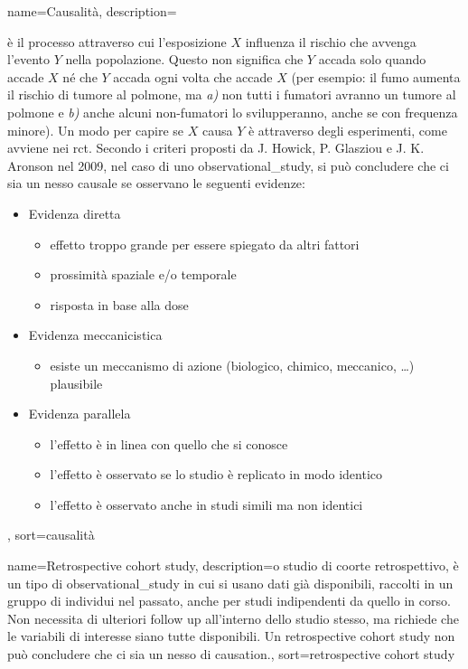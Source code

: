 {
	 name={Causalit\`a},
	 description={\`e il processo attraverso cui l'esposizione $X$ influenza il rischio che avvenga l'evento $Y$ nella popolazione. Questo non significa che $Y$ accada solo quando accade $X$ n\'e che $Y$ accada ogni volta che accade $X$ (per esempio: il fumo aumenta il rischio di tumore al polmone, ma \emph{a)} non tutti i fumatori avranno un tumore al polmone e \emph{b)} anche alcuni non-fumatori lo svilupperanno, anche se con frequenza minore). Un modo per capire se $X$ causa $Y$ \`e attraverso degli esperimenti, come avviene nei \gls{rct}. Secondo i criteri proposti da J. Howick, P. Glasziou e J. K. Aronson nel 2009, nel caso di uno \gls{observational_study}, si pu\`o concludere che ci sia un nesso causale se osservano le seguenti evidenze: 
	 \begin{itemize}
		 \item Evidenza diretta
		 	\begin{itemize} 
				\item effetto troppo grande per essere spiegato da altri fattori
        		\item prossimit\`a spaziale e/o temporale
        		\item risposta in base alla dose
			\end{itemize}
		\item Evidenza meccanicistica
	 		\begin{itemize} 
				\item esiste un meccanismo di azione (biologico, chimico, meccanico, \dots) plausibile
			\end{itemize}
		\item	Evidenza parallela
	 		\begin{itemize} 
				\item l'effetto \`e in linea con quello che si conosce
       		 	\item l'effetto \`e osservato se lo studio \`e replicato in modo identico
       		 	\item l'effetto \`e osservato anche in studi simili ma non identici
			\end{itemize}
	\end{itemize}
	},
	 sort={causalit\`a}
}

{
	name={Retrospective cohort study},
	description={o studio di coorte retrospettivo, \`e un tipo di \gls{observational_study} in cui si usano dati gi\`a disponibili, raccolti in un gruppo di individui nel passato, anche per studi indipendenti da quello in corso. Non necessita di ulteriori follow up all'interno dello studio stesso, ma richiede che le variabili di interesse siano tutte disponibili. Un retrospective cohort study non pu\`o concludere che ci sia un nesso di \gls{causation}.},
	sort={retrospective cohort study}
}

